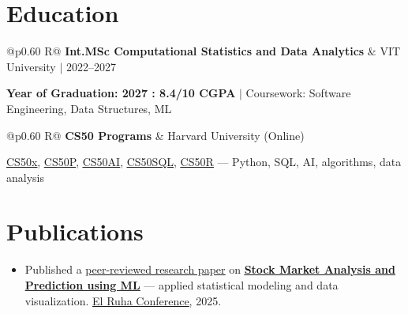 \documentclass[a4paper,10pt]{article}
\newcommand{\ulink}[2]{\href{#1}{\uline{#2}}}
\newcommand{\subheading}[1]{{\color[HTML]{0A0A0A}\fontsize{12}{14}\selectfont\bfseries #1}}
\newcommand{\meta}[1]{{\color[HTML]{5C5C5C}\fontsize{10.5}{12.5}\selectfont #1}}
\begin{document}
\vspace{2pt}

\section{Education}
\vspace{2pt}

\begin{tabularx}{\linewidth}{@{}p{0.60\linewidth} R@{}}
\subheading{Int.MSc Computational Statistics and Data Analytics} & \meta{VIT University $|$ 2022--2027}
\end{tabularx}
\vspace{1pt}
{\color[HTML]{3A3A3A}\fontsize{11}{14}\selectfont \textbf{Year of Graduation: 2027 : 8.4/10 CGPA} $|$ Coursework: Software Engineering, Data Structures, ML}

\begin{tabularx}{\linewidth}{@{}p{0.60\linewidth} R@{}}
\subheading{CS50 Programs} & \meta{Harvard University (Online)}
\end{tabularx}
\vspace{1pt}
{\color[HTML]{3A3A3A}\fontsize{11}{14}\selectfont \ulink{https://cs50.harvard.edu/certificates/b14b78df-e05c-413e-a607-1dd27303053a}{CS50x}, \ulink{https://cs50.harvard.edu/certificates/32477052-9db4-49c4-a5a4-d7e58429ca2c}{CS50P}, \ulink{https://cs50.harvard.edu/certificates/9cdb4d4a-1250-4f8e-9fd7-191864e0f919}{CS50AI}, \ulink{https://cs50.harvard.edu/certificates/bc486f24-f085-4e61-8536-80940b97a1b9}{CS50SQL}, \ulink{https://cs50.harvard.edu/certificates/666838e6-a053-4d82-b179-a60fe745fd84}{CS50R} --- Python, SQL, AI, algorithms, data analysis}

\vspace{2pt}

\section{Publications}
\vspace{2pt}
\begin{itemize}[nosep, leftmargin=1.5em, itemsep=1pt, topsep=2pt]
  \item {\color[HTML]{0A0A0A}\fontsize{11}{14}\selectfont
  Published a \ulink{https://www.elruha.org/_files/ugd/614b1f_6b95e1b697bf452b9907ba46e0151c05.pdf\#page=774}{peer-reviewed research paper} on \ulink{https://github.com/su-jin1425/Set-Project}{\textbf{Stock Market Analysis and Prediction using ML}} --- applied statistical modeling and data visualization. \ulink{https://www.elruha.org/congress-books}{El Ruha Conference}, 2025.}
\end{itemize}
\end{document}
